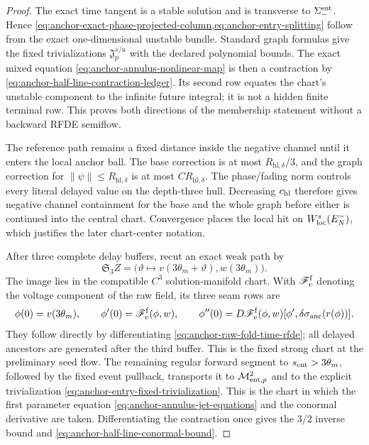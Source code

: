 \begin{proof}
The exact time tangent is a stable solution and is transverse to
\(\Sigma_-^{\rm ent}\).  Hence
\cref{eq:anchor-exact-phase-projected-column,eq:anchor-entry-splitting}
follow from the exact one-dimensional unstable bundle.  Standard graph
formulas give the fixed
trivializations \(\mathfrak J_p^{s/u}\) with the declared polynomial
bounds.  The exact mixed equation
\cref{eq:anchor-annulus-nonlinear-map} is then a contraction by
\cref{eq:anchor-half-line-contraction-ledger}.  Its second row equates the
chart's unstable component to the infinite future integral; it is not a
hidden finite terminal row.  This proves both directions of the membership
statement without a backward RFDE semiflow.

The reference path remains a fixed distance inside the negative channel
until it enters the local anchor ball.  The base correction is at most
\(R_{\mathrm{hl},\delta}/3\), and the graph correction for
\(\|\psi\|\le R_{\mathrm{hl},\delta}\) is at most
\(CR_{\mathrm{hl},\delta}\).  The phase/fading norm
controls every literal delayed value on the depth-three hull.  Decreasing
\(c_{\rm hl}\) therefore gives negative channel containment for the base
and the whole graph before either is continued into the central chart.
Convergence places the local hit on \(W^s_{\rm loc}(E_N^-)\), which
justifies the later chart-center notation.

After three complete delay buffers, recut an exact weak path by
\begin{equation}
 \mathfrak S_3Z
 =\bigl(\vartheta\mapsto v(3\theta_m+\vartheta),
                   w(3\theta_m)\bigr).               \label{eq:anchor-three-buffer-recut}
\end{equation}
The image lies in the compatible \(C^3\) solution-manifold chart.  With
\(\mathscr F_v^{\rm f}\) denoting the voltage component of the raw field,
its three seam rows are
\begin{equation}
 \phi(0)=v(3\theta_m),\qquad
 \phi'(0)=\mathscr F_v^{\rm f}(\phi,w),\qquad
 \phi''(0)=D\mathscr F_v^{\rm f}(\phi,w)
       [\phi',\delta\sigma_{\rm anc}(r(\phi))].        \label{eq:anchor-three-seam-rows}
\end{equation}
They follow directly by differentiating
\cref{eq:anchor-raw-fold-time-rfde}; all delayed ancestors are generated
after the third buffer.  This is the
fixed strong chart at the preliminary seed flow.  The remaining regular
forward segment to \(s_{\rm ent}>3\theta_m\), followed by the fixed event
pullback, transports it to \(\mathcal M_{{\rm ent},p}^2\) and to the
explicit trivialization
\cref{eq:anchor-entry-fixed-trivialization}.  This is the chart in which the first parameter equation
\cref{eq:anchor-annulus-jet-equations} and the conormal derivative are
taken.  Differentiating the contraction once gives the \(3/2\) inverse
bound and \cref{eq:anchor-half-line-conormal-bound}.


\end{proof}
